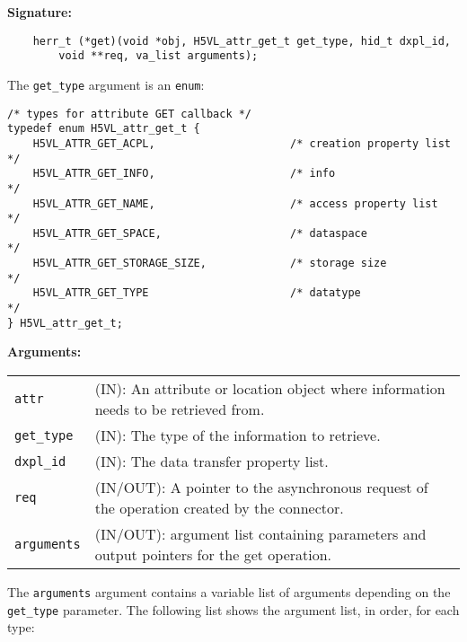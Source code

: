 \begin{mdframed}[style=bgbox]
\textbf{Signature:}
\begin{lstlisting}
    herr_t (*get)(void *obj, H5VL_attr_get_t get_type, hid_t dxpl_id, 
        void **req, va_list arguments);
\end{lstlisting}

The \texttt{get\_type} argument is an \texttt{enum}:
\begin{lstlisting}
/* types for attribute GET callback */
typedef enum H5VL_attr_get_t {                                                   
    H5VL_ATTR_GET_ACPL,                     /* creation property list              */
    H5VL_ATTR_GET_INFO,                     /* info                                */
    H5VL_ATTR_GET_NAME,                     /* access property list                */
    H5VL_ATTR_GET_SPACE,                    /* dataspace                           */
    H5VL_ATTR_GET_STORAGE_SIZE,             /* storage size                        */
    H5VL_ATTR_GET_TYPE                      /* datatype                            */
} H5VL_attr_get_t; 
\end{lstlisting}

\textbf{Arguments:}\\
\begin{tabular}{l p{13.5cm}}
  \texttt{attr} & (IN): An attribute or location object where information
  needs to be retrieved from.\\
  \texttt{get\_type} & (IN): The type of the information to retrieve.\\
  \texttt{dxpl\_id} & (IN): The data transfer property list.\\
  \texttt{req} & (IN/OUT): A pointer to the asynchronous request of the
  operation created by the connector.\\
  \texttt{arguments} & (IN/OUT): argument list containing parameters and
  output pointers for the get operation. \\
\end{tabular}
\end{mdframed}

The \texttt{arguments} argument contains a variable list of arguments
depending on the \texttt{get\_type} parameter. The following list shows
the argument list, in order, for each type:

